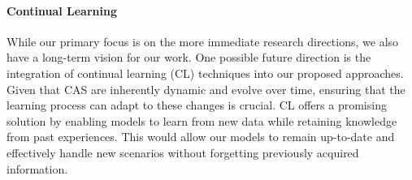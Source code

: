 \documentclass[12pt]{article}
\begin{document}
\paragraph{Continual Learning}
While our primary focus is on the more immediate research directions, 
 we also have a long-term vision for our work. 
% 
One possible future direction is the integration of continual learning (CL) techniques into our proposed approaches. 
%
Given that CAS are inherently dynamic and evolve over time, ensuring that the learning process can adapt to these changes is crucial. 
%
CL offers a promising solution by enabling models to learn from new data while retaining knowledge from past experiences. 
%
This would allow our models to remain up-to-date and effectively handle new scenarios without forgetting previously 
 acquired information.











\end{document}
